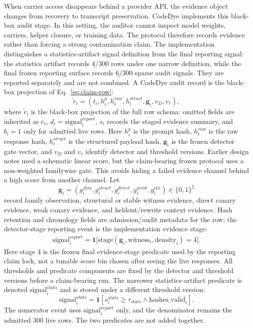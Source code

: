 When carrier access disappears behind a provider API, the evidence object changes from recovery to transcript preservation. CodeDye implements this black-box audit stage. In this setting, the auditor cannot inspect model weights, carriers, helper closure, or training data. The protocol therefore records evidence rather than forcing a strong contamination claim. The implementation distinguishes a statistics-artifact signal definition from the final reporting signal: the statistics artifact records 4/300 rows under one narrow definition, while the final frozen reporting surface records 6/300 sparse audit signals. They are reported separately and are not combined. A CodeDye audit record is the black-box projection of Eq.~\ref{eq:claim-row}:
\begin{equation}
  \tilde{r}_i = (t_i, h^{p}_i, h^{raw}_i, h^{struct}_i, \mathbf{g}_i, v_D, v_{\tau}),
\end{equation}
where $\tilde{r}_i$ is the black-box projection of the full row schema: omitted fields are inherited as $c_i$, $d_i=\mathrm{signal}^{report}_i$, $s_i$ records the staged evidence summary, and $b_i=1$ only for admitted live rows. Here $h^{p}_i$ is the prompt hash, $h^{raw}_i$ is the raw response hash, $h^{struct}_i$ is the structured payload hash, $\mathbf{g}_i$ is the frozen detector gate vector, and $v_D$ and $v_{\tau}$ identify detector and threshold versions. Earlier design notes used a schematic linear score, but the claim-bearing frozen protocol uses a non-weighted familywise gate. This avoids hiding a failed evidence channel behind a high score from another channel. Let
\begin{equation}
  \mathbf{g}_i=(g^{fam}_i,g^{struct}_i,g^{direct}_i,g^{weak}_i,g^{ctx}_i)\in\{0,1\}^5
\end{equation}
record family observation, structural or stable witness evidence, direct canary evidence, weak canary evidence, and heldout/rewrite context evidence. Hash retention and chronology fields are admission/audit metadata for the row; the detector-stage reporting event is the implementation evidence stage:
\begin{align}
  \mathrm{signal}^{report}_i
  = \mathbf{1}\bigl[\mathrm{stage}(\mathbf{g}_i,\mathrm{witness}_i,\mathrm{density}_i)=4\bigr].
\end{align}
Here stage 4 is the frozen final evidence-stage predicate used by the reporting claim lock, not a tunable score bin chosen after seeing the live responses. All thresholds and predicate components are fixed by the detector and threshold versions before a claim-bearing run.
The narrower statistics-artifact predicate is denoted $\mathrm{signal}^{stats}_i$ and is stored under a different threshold version:
\begin{equation}
  \mathrm{signal}^{stats}_i =
  \mathbf{1}[s^{stats}_i \geq \tau_{stats} \wedge \mathrm{hashes\_valid}_i].
\end{equation}
The numerator event uses $\mathrm{signal}^{report}_i$ only, and the denominator remains the admitted 300 live rows. The two predicates are not added together.

